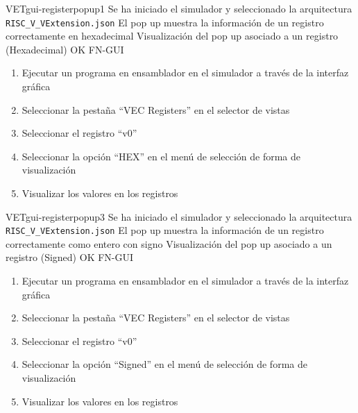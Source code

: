 \begin{testCase}{VET}{gui-registerpopup1}
    {Se ha iniciado el simulador y seleccionado la arquitectura \texttt{RISC\_V\_VExtension.json}}
    {El pop up muestra la información de un registro correctamente en hexadecimal}
    {Visualización del pop up asociado a un registro (Hexadecimal)} %
    {OK} %
    {FN-GUI}
    \begin{enumerate}
        \item Ejecutar un programa en ensamblador en el simulador a través de la interfaz gráfica
        \item Seleccionar la pestaña ``VEC Registers'' en el selector de vistas
        \item Seleccionar el registro ``v0''
        \item Seleccionar la opción ``HEX'' en el menú de selección de forma de visualización
        \item Visualizar los valores en los registros
    \end{enumerate}
\end{testCase}

\begin{testCase}{VET}{gui-registerpopup3}
    {Se ha iniciado el simulador y seleccionado la arquitectura \texttt{RISC\_V\_VExtension.json}}
    {El pop up muestra la información de un registro correctamente como entero con signo}
    {Visualización del pop up asociado a un registro (Signed)} %
    {OK} %
    {FN-GUI}
    \begin{enumerate}
        \item Ejecutar un programa en ensamblador en el simulador a través de la interfaz gráfica
        \item Seleccionar la pestaña ``VEC Registers'' en el selector de vistas
        \item Seleccionar el registro ``v0''
        \item Seleccionar la opción ``Signed'' en el menú de selección de forma de visualización
        \item Visualizar los valores en los registros
    \end{enumerate}
\end{testCase}

